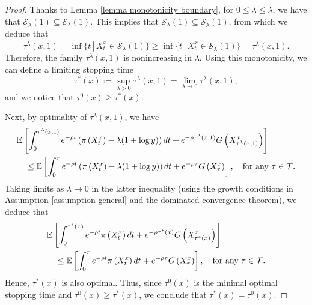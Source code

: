 \documentclass[10pt,a4paper]{amsart}
\def \dd{{\rm d}}
\begin{document}
\begin{proof}
    Thanks to Lemma \ref{lemma monotonicity boundary}, 
    for $0\leq \lambda \leq \bar \lambda$, we have that
     $\mathcal E_{\bar \lambda} (1) \subseteq   \mathcal E_{ \lambda} (1)$. 
     This implies that $\mathcal S_{ \lambda} (1) \subseteq   \mathcal S_{\bar \lambda} (1)$, from which we deduce that
     $$
     \tau^{\lambda} (x,1) = \inf \{ t \, | \, X_t^x \in \mathcal S _\lambda (1) \} \geq \inf \{ t \, | \, X_t^x \in \mathcal S _{\bar \lambda} (1) \} = \tau^{\bar \lambda} (x,1).
     $$
 Therefore, the family $\tau^\lambda (x,1)$ is nonincreasing in $\lambda$.
 Using this monotonicity, we can define a limiting stopping time 
 $$
 \tau ^*(x):= \sup_{\lambda >0} \tau^\lambda (x,1) = \lim _{\lambda \to 0} \tau^\lambda (x,1),
 $$
 and we notice that $\tau^0(x) \geq \tau^* (x)$.

Next, by optimality of $\tau^\lambda (x,1)$, we have
$$
\begin{aligned}
    &\mathbb{E}\left[\int_{0}^{\tau^\lambda (x,1)} e ^{-\rho t} \left( \pi\left(X^x_{t}\right) - \lambda (1+\log y) \right) \dd t+e^{-\rho {\tau^\lambda (x,1)}} G\left(X^x_{\tau^\lambda (x,1)}\right)\right] \\
    & \quad \leq  \mathbb{E}\left[\int_{0}^{\tau} e ^{-\rho t} \left( \pi\left(X^x_{t}\right) - \lambda (1+\log y) \right) \dd t+e^{-\rho {\tau}} G\left(X^x_{\tau}\right)\right], \quad \text{for any $\tau \in \mathcal T$.}
\end{aligned}
$$
Taking limits as $\lambda \to 0$ in the latter inequality (using the growth conditions in Assumption \ref{assumption general} and the dominated convergence theorem), we deduce that
$$
\begin{aligned}
    &\mathbb{E}\left[\int_{0}^{\tau^* (x)} e ^{-\rho t}  \pi\left(X^x_{t}\right)  \dd t+e^{-\rho {\tau^* (x)}} G\left(X^x_{\tau^* (x)}\right)\right] \\
    & \quad \leq  \mathbb{E}\left[\int_{0}^{\tau} e ^{-\rho t}   \pi\left(X^x_{t}\right) \dd t+e^{-\rho {\tau}} G\left(X^x_{\tau}\right)\right], \quad \text{for any $\tau \in \mathcal T$.}
\end{aligned}
$$
Hence, $\tau^*(x)$ is also optimal. Thus, since   $\tau^0(x)$ is the minimal optimal stopping time and $\tau^0(x) \geq \tau^* (x)$, we conclude that $\tau^*(x) = \tau^0(x)$. 
\end{proof} 
\end{document}
